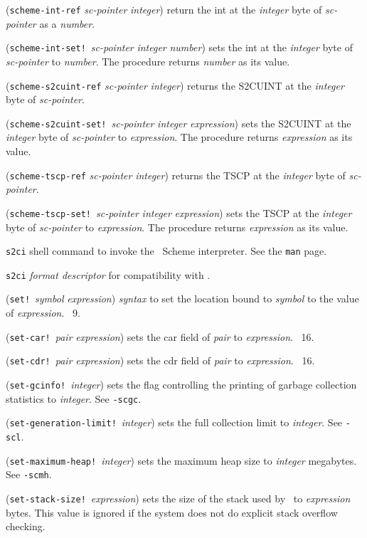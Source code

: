 \documentclass[10pt,twocolumn]{article}
\begin{document}
(\texttt{scheme-int-ref} \emph{sc-pointer} \emph{integer}) return the
int at the \emph{integer} byte of \emph{sc-pointer} as a
\emph{number}.

(\texttt{scheme-int-set!}\ \emph{sc-pointer} \emph{integer}
\emph{number}) sets the int at the \emph{integer} byte of
\emph{sc-pointer} to \emph{number}.  The procedure returns
\emph{number} as its value.

(\texttt{scheme-s2cuint-ref} \emph{sc-pointer} \emph{integer}) returns
the S2CUINT at the \emph{integer} byte of \emph{sc-pointer}.

(\texttt{scheme-s2cuint-set!}\ \emph{sc-pointer} \emph{integer}
\emph{expression}) sets the S2CUINT at the \emph{integer} byte of
\emph{sc-pointer} to \emph{expression}.  The procedure returns
\emph{expression} as its value.

(\texttt{scheme-tscp-ref} \emph{sc-pointer} \emph{integer}) returns
the TSCP at the \emph{integer} byte of \emph{sc-pointer}.

(\texttt{scheme-tscp-set!}\ \emph{sc-pointer} \emph{integer}
\emph{expression}) sets the TSCP at the \emph{integer} byte of
\emph{sc-pointer} to \emph{expression}.  The procedure returns
\emph{expression} as its value.

\texttt{s2ci} shell command to invoke the \StoC\ Scheme interpreter.
See the \texttt{man} page.

\texttt{s2ci} \emph{format descriptor} for compatibility with \RRRRS.

(\texttt{set!}\ \emph{symbol} \emph{expression}) \emph{syntax} to set
the location bound to \emph{symbol} to the value of \emph{expression}.
\RRRRRS~9.

(\texttt{set-car!}\ \emph{pair} \emph{expression}) sets the car field
of \emph{pair} to \emph{expression}.  \RRRRRS~16.

(\texttt{set-cdr!}\ \emph{pair} \emph{expression}) sets the cdr field
of \emph{pair} to \emph{expression}.  \RRRRRS~16.

(\texttt{set-gcinfo!}\ \emph{integer}) sets the flag controlling the
printing of garbage collection statistics to \emph{integer}.  See
\texttt{-scgc}.

(\texttt{set-generation-limit!}\ \emph{integer}) sets the full
collection limit to \emph{integer}.  See \texttt{-scl}.

(\texttt{set-maximum-heap!}\ \emph{integer}) sets the maximum heap
size to \emph{integer} megabytes.  See \texttt{-scmh}.

(\texttt{set-stack-size!}\ \emph{expression}) sets the size of the
stack used by \StoC\ to \emph{expression} bytes.  This value is
ignored if the system does not do explicit stack overflow checking.
\end{document}
